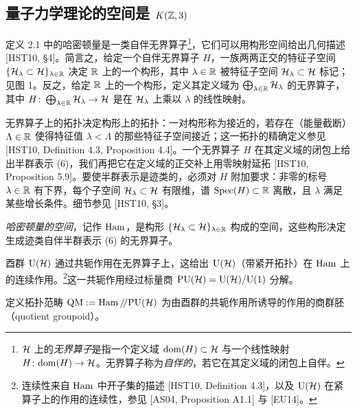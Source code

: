 \subsection{量子力学理论的空间是 $K(\mathbb{Z},3)$}
定义 2.1 中的哈密顿量是一类自伴无界算子\footnote{$\mathcal{H}$ 上的\emph{无界算子}是指一个定义域 $\mathrm{dom}(H)\subset\mathcal{H}$ 与一个线性映射 $H\colon\mathrm{dom}(H)\to\mathcal{H}$。无界算子称为\emph{自伴的}，若它在其定义域的闭包上自伴。}，它们可以用构形空间给出几何描述 [HST10, §4]。简言之，给定一个自伴无界算子 $H$，一族两两正交的特征子空间 $\{\mathcal{H}_\lambda\subset\mathcal{H}\}_{\lambda\in\mathbb{R}}$ 决定 $\mathbb{R}$ 上的一个构形，其中 $\lambda\in\mathbb{R}$ 被特征子空间 $\mathcal{H}_\lambda\subset\mathcal{H}$ 标记；见图 1。反之，给定 $\mathbb{R}$ 上的一个构形，定义其定义域为 $\bigoplus_{\lambda\in\mathbb{R}}\mathcal{H}_\lambda$ 的无界算子，其中 $H\colon\bigoplus_{\lambda\in\mathbb{R}}\mathcal{H}_\lambda\to\mathcal{H}$ 是在 $\mathcal{H}_\lambda$ 上乘以 $\lambda$ 的线性映射。

无界算子上的拓扑决定构形上的拓扑：一对构形称为接近的，若存在（能量截断）$\Lambda\in\mathbb{R}$ 使得特征值 $\lambda<\Lambda$ 的那些特征子空间接近；这一拓扑的精确定义参见 [HST10, Definition 4.3, Proposition 4.4]。一个无界算子 $H$ 在其定义域的闭包上给出半群表示 (6)，我们再把它在定义域的正交补上用零映射延拓 [HST10, Proposition 5.9]。要使半群表示是迹类的，必须对 $H$ 附加要求：非零的标号 $\lambda\in\mathbb{R}$ 有下界，每个子空间 $\mathcal{H}_\lambda\subset\mathcal{H}$ 有限维，谱 $\operatorname{Spec}(H)\subset\mathbb{R}$ 离散，且 $\lambda$ 满足某些增长条件。细节参见 [HST10, §3]。

\begin{definition}[2.3]
\emph{哈密顿量的空间}，记作 $\operatorname{Ham}$，是构形 $\{\mathcal{H}_\lambda\subset\mathcal{H}\}_{\lambda\in\mathbb{R}}$ 构成的空间，这些构形决定生成迹类自伴半群表示 (6) 的无界算子。
\end{definition}

酉群 $\mathrm{U}(\mathcal{H})$ 通过共轭作用在无界算子上，这给出 $\mathrm{U}(\mathcal{H})$（带紧开拓扑）在 $\operatorname{Ham}$ 上的连续作用。\footnote{连续性来自 $\operatorname{Ham}$ 中开子集的描述 [HST10, Definition 4.3]，以及 $\mathrm{U}(\mathcal{H})$ 在紧算子上的作用的连续性，参见 [AS04, Proposition A1.1] 与 [EU14]。}这一共轭作用经过标量商 $\mathrm{PU}(\mathcal{H})=\mathrm{U}(\mathcal{H})/\mathrm{U}(1)$ 分解。

\begin{definition}[2.4]
定义拓扑范畴 $\operatorname{QM}:=\operatorname{Ham}/\!/\mathrm{PU}(\mathcal{H})$ 为由酉群的共轭作用所诱导的作用的商群胚（quotient groupoid）。
\end{definition}

